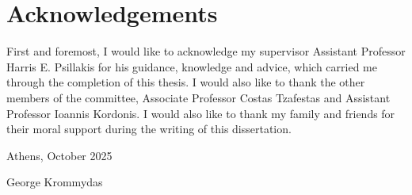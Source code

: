 \chapter*{Acknowledgements}
    \begin{flushleft}
        First and foremost, I would like to acknowledge my supervisor Assistant Professor Harris E. Psillakis for his guidance, knowledge and advice, which carried me through the completion of this thesis. I would also like to thank the other members of the committee, Associate Professor Costas Tzafestas and Assistant Professor Ioannis Kordonis.
        I would also like to thank my family and friends for their moral support during the writing of this dissertation.
    \end{flushleft}
    
    \vspace{2.5mm}
    
    \begin{flushright}
        Athens, October 2025
        
        \vspace{1.5mm}
        George Krommydas
    \end{flushright}
